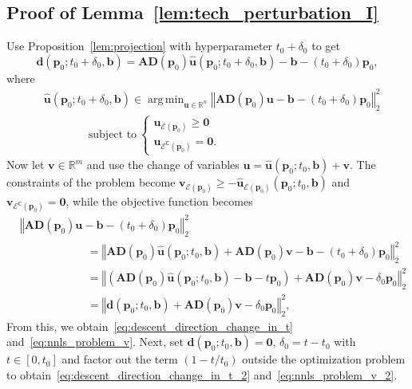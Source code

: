\documentclass[11pt]{article}
\numberwithin{prop}{section}
\numberwithin{lem}{section}
\numberwithin{rem}{section}
\numberwithin{cor}{section}
\numberwithin{thm}{section}
\numberwithin{defn}{section}
\numberwithin{fact}{section}
\theoremstyle{plain}
\def\bb {\boldsymbol{b}}
\def\bd {\boldsymbol{d}}
\def\tzero {t_{0}}
\def\bp {\boldsymbol{p}}
\def\bu {\boldsymbol{u}}
\def\bv {\boldsymbol{v}}
\def\R {\mathbb{R}}
\newcommand{\normsq}[1]{\left\Vert{#1} \right\Vert_{2}^{2}}
\newcommand{\matr}[1]{\bm{#1}}
\def\Rn {\R^n}
\def\Rm {\R^m}
\DeclareMathOperator*{\argmin}{arg\,min}
\def\bpo {\bp_{0}}
\def\epo {\mathcal{E}(\bp_{0})}
\def\ecpo {\mathcal{E}^{\mathsf{C}}(\bp_{0})}
\begin{document}
\subsection{Proof of Lemma~\ref{lem:tech_perturbation_I}} \label{app:tech_perturbation_I}
Use Proposition~\ref{lem:projection} with hyperparameter $\tzero + \delta_{0}$ to get
\[
\bd(\bpo;\tzero + \delta_{0},\bb) = \matr{A}\matr{D}(\bpo)\hat{\bu}(\bpo;\tzero + \delta_{0}, \bb) - \bb -(\tzero + \delta_{0})\bpo,
\]
where 
\[
\begin{alignedat}{1}
&\hat{\bu}(\bpo;\tzero + \delta_{0}, \bb) \in \argmin_{\bu \in \Rn} \normsq{\matr{A}\matr{D}(\bpo)\bu  - \bb -(\tzero + \delta_{0})\bpo} \\
&\qquad\qquad \text{subject to} \ 
	\begin{cases}
		\bu_{\epo} \geqslant \boldsymbol{0} \\
		\bu_{\ecpo} = \boldsymbol{0}.
	\end{cases}
\end{alignedat}
\]
Now let $\bv \in \Rm$ and use the change of variables $\bu = \hat{\bu}(\bpo;\tzero,\bb) + \bv$. The constraints of the problem become $\bv_{\epo} \geqslant -\hat{\bu}_{\epo}(\bpo;\tzero,\bb)$ and $\bv_{\ecpo} = \boldsymbol{0}$, while the objective function becomes
\[
\begin{alignedat}{1}
&\normsq{\matr{A}\matr{D}(\bpo)\bu  - \bb  -(\tzero + \delta_{0})\bpo} \\
	&\qquad \qquad \qquad = \normsq{\matr{A}\matr{D}(\bpo)\hat{\bu}(\bpo;\tzero,\bb) + \matr{A}\matr{D}(\bpo)\bv - \bb -(\tzero + \delta_{0})\bpo} \\
&\qquad \qquad \qquad = \normsq{\left(\matr{A}\matr{D}(\bpo)\hat{\bu}(\bpo;\tzero,\bb) -\bb - t\bpo\right) +\matr{A}\matr{D}(\bpo)\bv - \delta_{0}\bpo} \\
&\qquad \qquad \qquad = \normsq{\bd(\bpo;\tzero,\bb) + \matr{A}\matr{D}(\bpo)\bv - \delta_{0}\bpo},
\end{alignedat}
\]
From this, we obtain~\eqref{eq:descent_direction_change_in_t} and~\eqref{eq:nnls_problem_v}. Next, set $\bd(\bpo;\tzero,\bb) = \boldsymbol{0}$, $\delta_{0} = t - \tzero$ with $t \in [0,\tzero]$ and factor out the term $(1-t/\tzero)$ outside the optimization problem to obtain~\eqref{eq:descent_direction_change_in_t_2} and~\eqref{eq:nnls_problem_v_2}.



\end{document}
